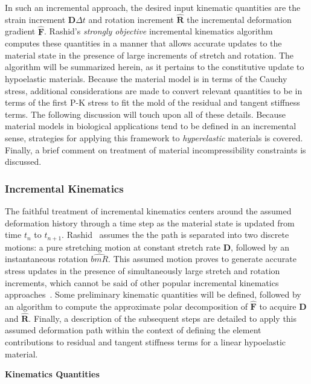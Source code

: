 In such an incremental approach, the desired input kinematic quantities are the strain increment $\bm{D}\Delta{t}$ and rotation increment $\hat{\bm{R}}$ the incremental deformation gradient $\hat{\bm{F}}$. Rashid's \textit{strongly objective} incremental kinematics algorithm~\cite{rashid_1993} computes these quantities in a manner that allows accurate updates to the material state in the presence of large increments of stretch and rotation. The algorithm will be summarized herein, as it pertains to the constitutive update to hypoelastic materials. Because the material model is in terms of the Cauchy stress, additional considerations are made to convert relevant quantities to be in terms of the first P-K stress to fit the mold of the residual and tangent stiffness terms. The following discussion will touch upon all of these details. Because material models in biological applications tend to be defined in an incremental sense, strategies for applying this framework to \textit{hyperelastic} materials is covered. Finally, a brief comment on treatment of material incompressibility constraints is discussed.

\subsubsection{Incremental Kinematics}

The faithful treatment of incremental kinematics centers around the assumed deformation history through a time step as the material state is updated from time $t_n$ to $t_{n+1}$. Rashid~\cite{rashid_1993} assumes the the path is separated into two discrete motions: a pure stretching motion at constant stretch rate $\bm{D}$, followed by an instantaneous rotation $\hat{bm{R}}$. This assumed motion proves to generate accurate stress updates in the presence of simultaneously large stretch and rotation increments, which cannot be said of other popular incremental kinematics approaches~\cite{rashid_1996}. Some preliminary kinematic quantities will be defined, followed by an algorithm to compute the approximate polar decomposition of $\hat{\bm{F}}$ to acquire $\bm{D}$ and $\hat{\bm{R}}$. Finally, a description of the subsequent steps are detailed to apply this assumed deformation path within the context of defining the element contributions to residual and tangent stiffness terms for a linear hypoelastic material.

\textbf{Kinematics Quantities}

